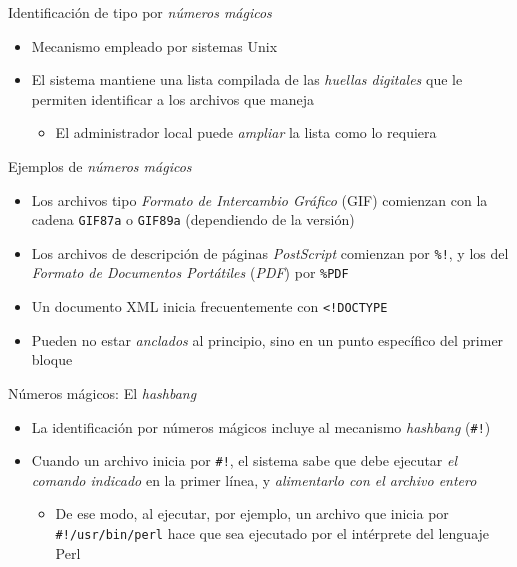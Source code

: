 \documentclass[presentation]{beamer}
\begin{document}
\begin{frame}[label={sec:orgddb7504}]{Identificación de tipo por \emph{números mágicos}}
\begin{itemize}
\item Mecanismo empleado por sistemas Unix
\item El sistema mantiene una lista compilada de las \emph{huellas digitales}
que le permiten identificar a los archivos que maneja
\begin{itemize}
\item El administrador local puede \emph{ampliar} la lista como lo requiera
\end{itemize}
\end{itemize}
\end{frame}

\begin{frame}[label={sec:org0156ad3},fragile]{Ejemplos de \emph{números mágicos}}
 \begin{itemize}
\item Los archivos tipo \emph{Formato de Intercambio Gráfico} (GIF)
comienzan con la cadena \texttt{GIF87a} o \texttt{GIF89a} (dependiendo de la versión)
\item Los archivos de descripción de páginas \emph{PostScript} comienzan por
\texttt{\%!}, y los del \emph{Formato de Documentos Portátiles} (\emph{PDF}) por \texttt{\%PDF}
\item Un documento XML inicia frecuentemente con \texttt{<!DOCTYPE}
\item Pueden no estar \emph{anclados} al principio, sino en un punto
específico del primer bloque
\end{itemize}
\end{frame}

\begin{frame}[label={sec:org2ccd525},fragile]{Números mágicos: El \emph{hashbang}}
 \begin{itemize}
\item La identificación por números mágicos incluye al mecanismo
\emph{hashbang} (\texttt{\#!})
\item Cuando un archivo inicia por \texttt{\#!}, el sistema sabe que debe ejecutar
\emph{el comando indicado} en la primer línea, y \emph{alimentarlo con el
archivo entero}
\begin{itemize}
\item De ese modo, al ejecutar, por ejemplo, un archivo que inicia por
\texttt{\#!/usr/bin/perl} hace que sea ejecutado por el intérprete del
lenguaje Perl
\end{itemize}
\end{itemize}
\end{frame}
\end{document}
